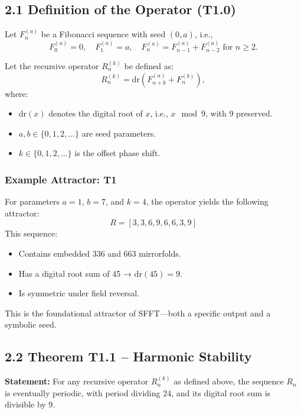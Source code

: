 \documentclass[12pt]{article}
\begin{document}
\subsection*{2.1 Definition of the Operator (T1.0)}

Let \( F^{(a)}_n \) be a Fibonacci sequence with seed \( (0, a) \), i.e.,
\[
F^{(a)}_0 = 0,\quad F^{(a)}_1 = a,\quad F^{(a)}_n = F^{(a)}_{n-1} + F^{(a)}_{n-2} \text{ for } n \geq 2.
\]

Let the recursive operator \( R^{(k)}_n \) be defined as:
\[
R^{(k)}_n = \mathrm{dr}\left(F^{(a)}_{n+k} + F^{(b)}_n\right),
\]
where:
\begin{itemize}
    \item \( \mathrm{dr}(x) \) denotes the digital root of \( x \), i.e., \( x \mod 9 \), with 9 preserved.
\item \( a, b \in \{0, 1, 2, \dots\} \) are seed parameters.
\item \( k \in \{0, 1, 2, \dots\} \) is the offset phase shift.

\end{itemize}

\subsubsection*{Example Attractor: T1}

For parameters \( a = 1 \), \( b = 7 \), and \( k = 4 \), the operator yields the following attractor:
\[
R = [3, 3, 6, 9, 6, 6, 3, 9]
\]
This sequence:
\begin{itemize}
    \item Contains embedded 336 and 663 mirrorfolds.
    \item Has a digital root sum of 45 → \( \mathrm{dr}(45) = 9 \).
    \item Is symmetric under field reversal.
\end{itemize}

This is the foundational attractor of SFFT—both a specific output and a symbolic seed.

\subsection*{2.2 Theorem T1.1 – Harmonic Stability}

\textbf{Statement:}  
For any recursive operator \( R^{(k)}_n \) as defined above, the sequence \( R_n \) is eventually periodic, with period dividing 24, and its digital root sum is divisible by 9.
\end{document}
